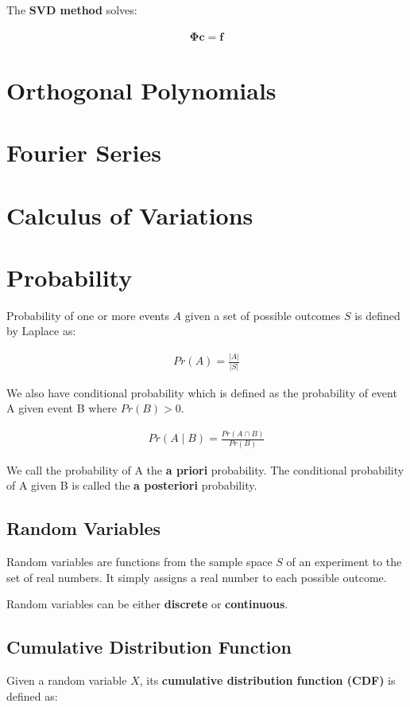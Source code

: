 \documentclass[11pt]{article}
\begin{document}
The \textbf{SVD method} solves:

\begin{align*}
    \boldsymbol{\Phi}\boldsymbol{c} = \boldsymbol{f}
\end{align*}

\section{Orthogonal Polynomials}
\label{sec:org93c9cb3}
\section{Fourier Series}
\label{sec:org538e3a9}
\section{Calculus of Variations}
\label{sec:org7965379}
\section{Probability}
\label{sec:org338045a}
Probability of one or more events \(A\) given a set of possible outcomes \(S\) is defined by Laplace as:

\begin{align*}
    Pr\left(A\right) = \frac{\vert A \vert}{\vert S \vert}
\end{align*}

We also have conditional probability which is defined as the probability of event A given event B where \(Pr\left(B\right) > 0\).

\begin{align*}
     Pr\left(A \mid B\right) = \frac{Pr\left(A \cap B\right)}{Pr\left(B\right)}
\end{align*}

We call the probability of A the \textbf{a priori} probability. The conditional probability of A given B is called the \textbf{a posteriori} probability.

\subsection{Random Variables}
\label{sec:org1cc67eb}
Random variables are functions from the sample space \(S\) of an experiment to the set of real numbers. It simply assigns a real number to each possible outcome.

Random variables can be either \textbf{discrete} or \textbf{continuous}.

\subsection{Cumulative Distribution Function}
\label{sec:org0b85f6a}
Given a random variable \(X\), its \textbf{cumulative distribution function (CDF)} is defined as:
\end{document}
